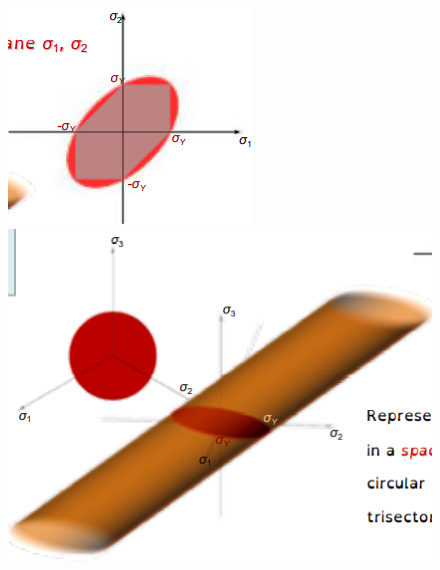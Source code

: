 \documentclass[class=report, crop=false, 12pt,a4paper]{standalone}
\begin{document}
\begin{figure}
  \begin{center}
    \begin{minipage}[b]{0.46\textwidth}
      \centering
      \includegraphics[width = \textwidth]{../img/diagram94.png}
      \caption{}
    \end{minipage}
    \begin{minipage}[b]{0.46\textwidth}
      \centering
      \includegraphics[width = \textwidth]{../img/diagram95.png}
      \caption{}
    \end{minipage}
  \end{center}
\end{figure}
\end{document}

